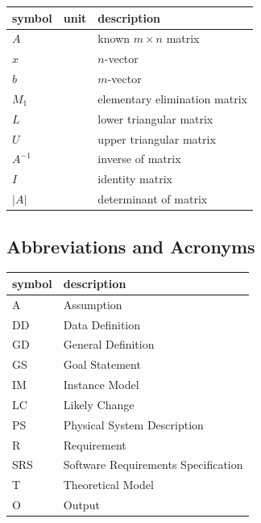 \documentclass[12pt]{article}
\begin{document}
\renewcommand{\arraystretch}{1.2}
\noindent \begin{longtable*}{l l p{12cm}} \toprule
\textbf{symbol} & \textbf{unit} & \textbf{description}\\
\midrule


$A$ & \text{-} & known $m \times n$ matrix \\
$x$ & \text{-} & $n$-vector\\
$b$ & \text{-} & $m$-vector\\
$M_1$ & \text{-} & elementary elimination matrix\\
$L$ & \text{-} & lower triangular matrix\\
$U$ & \text{-} & upper triangular matrix\\ 
$A^{-1}$ & \text{-} & inverse of matrix \\
$I$ & \text{-} & identity matrix\\
${|A|}$ & \text{-} & determinant of matrix\\ 

\bottomrule
\end{longtable*}


\subsection{Abbreviations and Acronyms}

\renewcommand{\arraystretch}{1.2}
\begin{tabular}{l l} 
  \toprule		
  \textbf{symbol} & \textbf{description}\\
  \midrule 
  A & Assumption\\
  DD & Data Definition\\
  GD & General Definition\\
  GS & Goal Statement\\
  IM & Instance Model\\
  LC & Likely Change\\
  PS & Physical System Description\\
  R & Requirement\\
  SRS & Software Requirements Specification\\

  T & Theoretical Model\\
  O & Output\\
  \bottomrule
\end{tabular}\\
\end{document}
